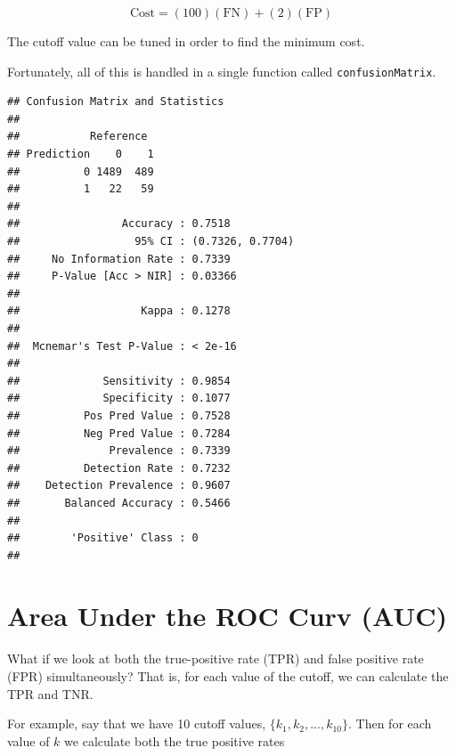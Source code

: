 \documentclass[openany]{book}
\newenvironment{Shaded}{\begin{snugshade}}{\end{snugshade}}
\newcommand{\KeywordTok}[1]{\textcolor[rgb]{0.13,0.29,0.53}{\textbf{#1}}}
\newcommand{\NormalTok}[1]{#1}
\newcommand{\OperatorTok}[1]{\textcolor[rgb]{0.81,0.36,0.00}{\textbf{#1}}}
\begin{document}
\[\text{Cost} = (100)(\text{FN}) + (2)(\text{FP})\]

The cutoff value can be tuned in order to find the minimum cost.

Fortunately, all of this is handled in a single function called \texttt{confusionMatrix}.

\begin{Shaded}
\end{Shaded}

\begin{verbatim}
## Confusion Matrix and Statistics
## 
##           Reference
## Prediction    0    1
##          0 1489  489
##          1   22   59
##                                           
##                Accuracy : 0.7518          
##                  95% CI : (0.7326, 0.7704)
##     No Information Rate : 0.7339          
##     P-Value [Acc > NIR] : 0.03366         
##                                           
##                   Kappa : 0.1278          
##                                           
##  Mcnemar's Test P-Value : < 2e-16         
##                                           
##             Sensitivity : 0.9854          
##             Specificity : 0.1077          
##          Pos Pred Value : 0.7528          
##          Neg Pred Value : 0.7284          
##              Prevalence : 0.7339          
##          Detection Rate : 0.7232          
##    Detection Prevalence : 0.9607          
##       Balanced Accuracy : 0.5466          
##                                           
##        'Positive' Class : 0               
## 
\end{verbatim}

\hypertarget{area-under-the-roc-curv-auc}{%
\section{Area Under the ROC Curv (AUC)}\label{area-under-the-roc-curv-auc}}

What if we look at both the true-positive rate (TPR) and false positive rate (FPR) simultaneously? That is, for each value of the cutoff, we can calculate the TPR and TNR.

For example, say that we have 10 cutoff values, \(\{k_1, k_2, ..., k_{10}\}\). Then for each value of \(k\) we calculate both the true positive rates
\end{document}
